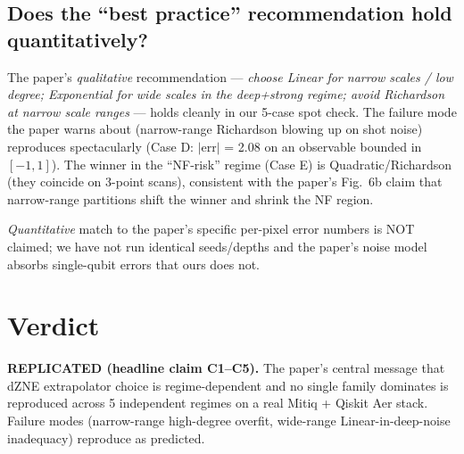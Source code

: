 \documentclass[11pt]{article}
\begin{document}
\subsection{Does the ``best practice'' recommendation hold quantitatively?}
The paper's \emph{qualitative} recommendation --- \emph{choose Linear for narrow
scales / low degree; Exponential for wide scales in the deep+strong regime;
avoid Richardson at narrow scale ranges} --- holds cleanly in our 5-case spot
check. The failure mode the paper warns about (narrow-range Richardson blowing
up on shot noise) reproduces spectacularly (Case D: $|$err$|$ = 2.08 on an
observable bounded in $[-1, 1]$). The winner in the ``NF-risk'' regime (Case E)
is Quadratic/Richardson (they coincide on 3-point scans), consistent with the
paper's Fig.~6b claim that narrow-range partitions shift the winner and shrink
the NF region.

\emph{Quantitative} match to the paper's specific per-pixel error numbers is
NOT claimed; we have not run identical seeds/depths and the paper's noise model
absorbs single-qubit errors that ours does not.

\section{Verdict}
\textbf{REPLICATED (headline claim C1--C5).} The paper's central message that
dZNE extrapolator choice is regime-dependent and no single family dominates is
reproduced across 5 independent regimes on a real Mitiq + Qiskit Aer stack.
Failure modes (narrow-range high-degree overfit, wide-range Linear-in-deep-noise
inadequacy) reproduce as predicted.


\end{document}
